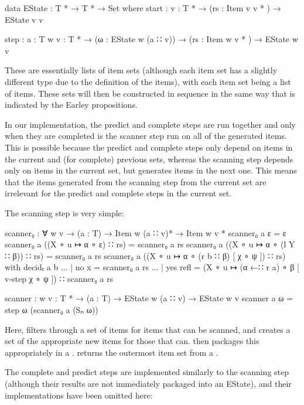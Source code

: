 		\begin{code}
			data EState : T * → T * → Set where
			  start : {v : T *} →
			    (rs : Item v v * ) →
			    EState v v

			  step : {a : T} {w v : T *} →
			    (ω : EState w (a ∷ v)) →
			    (rs : Item w v * ) →
			    EState w v
		\end{code}

		These are essentially lists of item sets (although each item set has a
		slightly different type due to the definition of the items), with each
		item set being a list of items. These sets will then be constructed in
		sequence in the same way that is indicated by the Earley propositions.

		In our implementation, the predict and complete steps are run together
		and only when they are completed is the scanner step run on all of the
		generated items. This is possible because the predict and complete
		steps only depend on items in the current and (for complete) previous
		sets, whereas the scanning step depends only on items in the current
		set, but generates items in the next one. This means that the items
		generated from the scanning step from the current set are irrelevant
		for the predict and complete steps in the current set.

		The scanning step is very simple:

		\begin{code}
			scanner₀ : ∀ {w v} →
			  (a : T) →
			  Item w (a ∷ v)* →
			  Item w v *
			scanner₀ a ε = ε
			scanner₀ a ((X ∘ u ↦ α ∘ ε) ∷ rs) = scanner₀ a rs
			scanner₀ a ((X ∘ u ↦ α ∘ (l Y ∷ β)) ∷ rs) = scanner₀ a rs
			scanner₀ a ((X ∘ u ↦ α ∘ (r b ∷ β) [ χ ∘ ψ ]) ∷ rs) with decidₜ a b
			... | no x = scanner₀ a rs
			... | yes refl =
			  (X ∘ u ↦ (α ←∷ r a) ∘ β [ v-step χ ∘ ψ ]) ∷ scanner₀ a rs

			scanner : {w v : T *} →
			  (a : T) →
			  EState w (a ∷ v) →
			  EState w v
			scanner a ω = step ω (scanner₀ a (Sₙ ω))
		\end{code}

		Here,  filters through a set of items for items that
		can be scanned, and creates a set of the appropriate new items for
		those that can.  then packages this appropriately in a
		.  returns the outermost item set from a
		.

		The complete and predict steps are implemented similarly to the
		scanning step (although their results are not immediately packaged into
		an EState), and their implementations have been omitted here:

